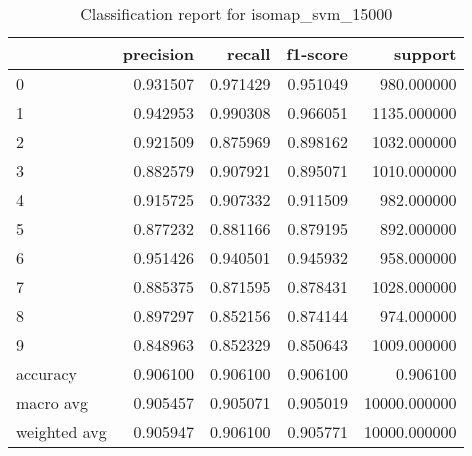 \begin{table}[htb!]
\centering
\caption{Classification report for isomap_svm_15000}
\label{tab:classification-report-isomap_svm_15000}
\begin{tabular}{lrrrr}
\toprule
 & precision & recall & f1-score & support \\
\midrule
0 & 0.931507 & 0.971429 & 0.951049 & 980.000000 \\
1 & 0.942953 & 0.990308 & 0.966051 & 1135.000000 \\
2 & 0.921509 & 0.875969 & 0.898162 & 1032.000000 \\
3 & 0.882579 & 0.907921 & 0.895071 & 1010.000000 \\
4 & 0.915725 & 0.907332 & 0.911509 & 982.000000 \\
5 & 0.877232 & 0.881166 & 0.879195 & 892.000000 \\
6 & 0.951426 & 0.940501 & 0.945932 & 958.000000 \\
7 & 0.885375 & 0.871595 & 0.878431 & 1028.000000 \\
8 & 0.897297 & 0.852156 & 0.874144 & 974.000000 \\
9 & 0.848963 & 0.852329 & 0.850643 & 1009.000000 \\
accuracy & 0.906100 & 0.906100 & 0.906100 & 0.906100 \\
macro avg & 0.905457 & 0.905071 & 0.905019 & 10000.000000 \\
weighted avg & 0.905947 & 0.906100 & 0.905771 & 10000.000000 \\
\bottomrule
\end{tabular}
\end{table}
